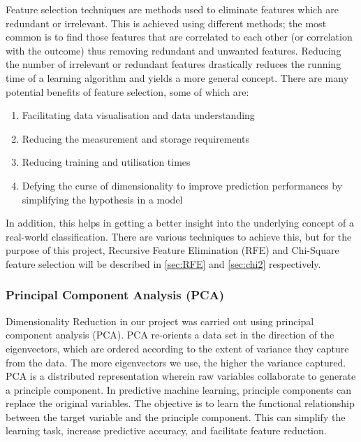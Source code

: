 Feature selection techniques are methods used to eliminate features which are redundant or irrelevant. This is achieved using different methods; the most common is to find those features that are correlated to each other (or correlation with the outcome) thus removing redundant and unwanted features. 
Reducing the number of irrelevant or redundant features drastically reduces the running time of a learning algorithm and yields a more general concept. There are many potential benefits of feature selection, some of which are:
\begin{enumerate}
    \item Facilitating data visualisation and data understanding
    \item Reducing the measurement and storage requirements
    \item Reducing training and utilisation  times
    \item Defying the curse of dimensionality to improve prediction performances by simplifying the hypothesis in a model
\end{enumerate}

In addition, this helps in getting a better insight into the underlying concept of a real-world classification.
There are various techniques to achieve this, but for the purpose of this project, Recursive Feature Elimination (RFE) and Chi-Square feature selection will be described in \autoref{sec:RFE} and \autoref{sec:chi2} respectively.

\subsubsection{Principal Component Analysis (PCA)}
\label{sec:pca}
Dimensionality Reduction in our project was carried out using principal component analysis (PCA).
PCA re-orients a data set in the direction of the eigenvectors, which are ordered according to the extent of variance they capture from the data. The more eigenvectors we use, the higher the variance captured. PCA is a distributed representation wherein raw variables collaborate to generate a principle component. In predictive machine learning, principle components can replace the original variables. The objective is to learn the functional relationship between the target variable and the principle component. This can simplify the learning task, increase predictive accuracy, and facilitate feature reduction. 

